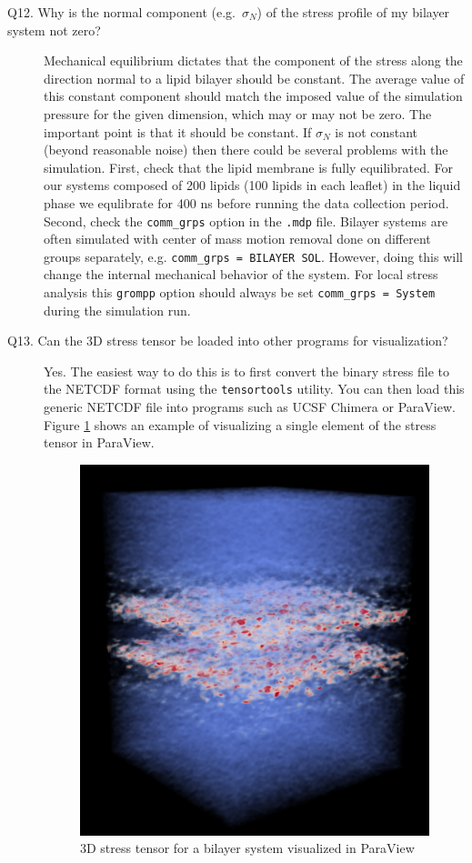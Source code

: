 \documentclass[10pt,letterpaper,notitlepage]{article}
\begin{document}
\begin{description}
\item[Q12. Why is the normal component (e.g.~$\sigma_{N}$) of the stress profile of my bilayer system not zero?] Mechanical equilibrium dictates that the component of the stress along the direction normal to a lipid bilayer should be constant. The average value of this constant component should match the imposed value of the simulation pressure for the given dimension, which may or may not be zero. The important point is that it should be constant. If $\sigma_{N}$ is not constant (beyond reasonable noise) then there could be several problems with the simulation. First, check that the lipid membrane is fully equilibrated. For our systems composed of 200 lipids (100 lipids in each leaflet) in the liquid phase we equlibrate for 400 ns before running the data collection period. Second, check the \texttt{comm\_grps} option in the \texttt{.mdp} file. Bilayer systems are often simulated with center of mass motion removal done on different groups separately, e.g. \texttt{comm\_grps = BILAYER SOL}. However, doing this will change the internal mechanical behavior of the system. For local stress analysis this \texttt{grompp} option should always be set \texttt{comm\_grps = System} during the simulation run.

\item[Q13. Can the 3D stress tensor be loaded into other programs for visualization?] Yes. The easiest way to do this is to first convert the binary stress file to the NETCDF format using the \texttt{tensortools} utility. You can then load this generic NETCDF file into programs such as UCSF Chimera or ParaView. Figure \ref{paraview} shows an example of visualizing  a single element of the stress tensor in ParaView.

\begin{figure}[!h]
\centering
\includegraphics[width=4in]{figs/3D_stress_black_bw.pdf}
\caption{3D stress tensor for a bilayer system visualized in ParaView}\label{paraview}
\end{figure}


\end{description}
\end{document}
